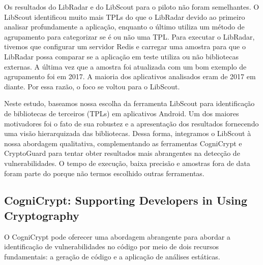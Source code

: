 Os resultados do LibRadar e do LibScout para o piloto não foram semelhantes. O LibScout identificou muito mais TPLs do que o LibRadar devido ao primeiro analisar profundamente a aplicação, enquanto o último utiliza um método de agrupamento para categorizar se é ou não uma TPL. Para executar o LibRadar, tivemos que configurar um servidor Redis e carregar uma amostra para que o LibRadar possa comparar se a aplicação em teste utiliza ou não bibliotecas externas. A última vez que a amostra foi atualizada com um bom exemplo de agrupamento foi em 2017. A maioria dos aplicativos analisados eram de 2017 em diante. Por essa razão, o foco se voltou para o LibScout.



Neste estudo, baseamos nossa escolha da ferramenta LibScout para identificação de bibliotecas de terceiros (TPLs) em aplicativos Android. Um dos maiores motivadores foi o fato de sua robustez e a apresentação dos resultados fornecendo uma visão hierarquizada das bibliotecas. Dessa forma, integramos o LibScout à nossa abordagem qualitativa, complementando as ferramentas CogniCrypt e CryptoGuard para tentar obter resultados mais abrangentes na detecção de vulnerabilidades. O tempo de execução, baixa precisão e amostras fora de data foram parte do porque não termos escolhido outras ferramentas.

\subsection{CogniCrypt: Supporting Developers in Using Cryptography}

O CogniCrypt pode oferecer uma abordagem abrangente para abordar a identificação de vulnerabilidades no código por meio de dois recursos fundamentais: a geração de código e a aplicação de análises estáticas.

